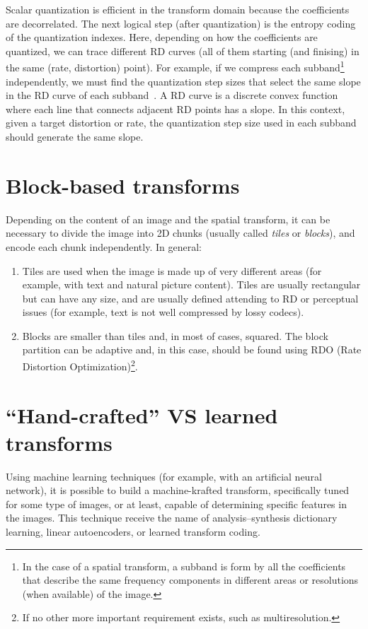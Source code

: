 Scalar quantization is efficient in the transform domain because the
coefficients are decorrelated. The next logical step (after
quantization) is the entropy coding of the quantization indexes. Here,
depending on how the coefficients are quantized, we can trace
different RD curves (all of them starting (and finising) in the same
(rate, distortion) point). For example, if we compress each
subband\footnote{In the case of a spatial transform, a subband is form
  by all the coefficients that describe the same frequency components
  in different areas or resolutions (when available) of the image.}
independently, we must find the quantization step sizes that select
the same slope in the RD curve of each
subband~\cite{vruiz__information_theory}. A RD curve is a discrete
convex function where each line that connects adjacent RD points has a
slope.  In this context, given a target distortion or rate, the
quantization step size used in each subband should generate the same
slope.


\section{Block-based transforms}

Depending on the content of an image and the spatial transform, it can
be necessary to divide the image into 2D chunks (usually called
\emph{tiles} or \emph{blocks}), and encode each chunk
independently. In general:
\begin{enumerate}
\item Tiles are used when the image is made up of very different areas
  (for example, with text and natural picture content). Tiles are
  usually rectangular but can have any size, and are usually defined
  attending to RD or perceptual issues (for example, text is not well
  compressed by lossy codecs).
\item Blocks are smaller than tiles and, in most of cases,
  squared. The block partition can be adaptive and, in this case,
  should be found using RDO (Rate Distortion Optimization)\footnote{If
    no other more important requirement exists, such as
    multiresolution.}.
\end{enumerate}

\section{``Hand-crafted'' VS learned transforms}

Using machine learning techniques (for example, with an artificial
neural network), it is possible to build a machine-krafted transform,
specifically tuned for some type of images, or at least, capable of
determining specific features in the images. This technique receive
the name of analysis–synthesis dictionary learning, linear
autoencoders, or learned transform coding.

